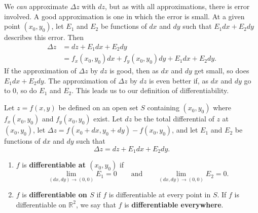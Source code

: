 We \emph{can} approximate $\Delta z$ with $dz$, but as with all approximations, there is error involved. A good approximation is one in which the error is small. At a given point $(x_0,y_0)$, let $E_1$ and $E_2$ be functions of $dx$ and $dy$ such that $E_1dx+E_2dy$ describes this error. Then
\begin{align*}
\Delta z &= dz + E_1dx+ E_2dy \\
		&= f_x(x_0,y_0)dx+f_y(x_0,y_0)dy + E_1dx+E_2dy.
\end{align*}
If the approximation of $\Delta z$ by $dz$ is good, then as $dx$ and $dy$ get small,  so does $E_1dx+E_2dy$. The approximation of $\Delta z$ by $dz$ is even better if, as $dx$ and $dy$ go to 0, so do $E_1$ and $E_2$. This leads us to our definition of differentiability.

{Let $z=f(x,y)$ be defined on an open set $S$ containing $(x_0,y_0)$ where $f_x(x_0,y_0)$ and $f_y(x_0,y_0)$ exist. Let $dz$ be the total differential of $z$ at $(x_0,y_0)$, let $\Delta z = f(x_0+dx,y_0+dy) - f(x_0,y_0)$, and let $E_1$ and $E_2$ be functions of $dx$ and $dy$  such that 
\[\Delta z = dz + E_1dx + E_2dy.\]
\begin{enumerate}
	\item $f$ is \textbf{differentiable at $(x_0,y_0)$} if%
	\[\lim_{(dx,dy)\to(0,0)}E_1=0\qquad\text{and}\qquad\lim_{(dx,dy)\to(0,0)}E_2=0.\]
	\item $f$ is \textbf{differentiable on $S$} if $f$ is differentiable at every point in $S$. If $f$ is differentiable on $\mathbb{R}^2$, we say that $f$ is \textbf{differentiable everywhere}.
\end{enumerate}}

